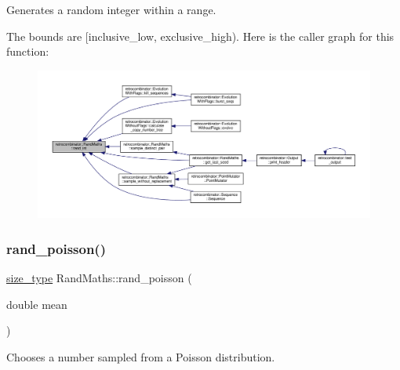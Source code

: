 Generates a random integer within a range. 

The bounds are \mbox{[}inclusive\+\_\+low, exclusive\+\_\+high). Here is the caller graph for this function\+:
\nopagebreak
\begin{figure}[H]
\begin{center}
\leavevmode
\includegraphics[width=350pt]{classretrocombinator_1_1RandMaths_a8072bad64e64ef042e5257e1bee85635_icgraph}
\end{center}
\end{figure}
\mbox{\label{classretrocombinator_1_1RandMaths_adef66efd4d58f6130982ff0ee0e25750}} 
\subsubsection{\texorpdfstring{rand\+\_\+poisson()}{rand\_poisson()}}
{\footnotesize\ttfamily \hyperlink{constants_8h_a8e1541b50cee66a791df4c437ccbb385}{size\+\_\+type} Rand\+Maths\+::rand\+\_\+poisson (\begin{DoxyParamCaption}\item[{double}]{mean }\end{DoxyParamCaption})}



Chooses a number sampled from a Poisson distribution. 

